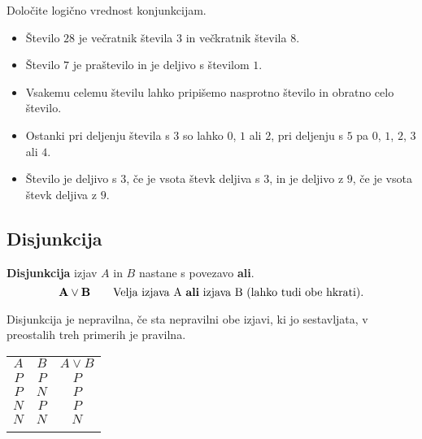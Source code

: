          

         
             \begin{naloga}
                Določite logično vrednost konjunkcijam.
                \begin{itemize}
                    \item Število $28$ je večratnik števila $3$ in večkratnik števila $8$.
                    \item Število $7$ je praštevilo in je deljivo s številom $1$.
                    \item Vsakemu celemu številu lahko pripišemo nasprotno število in obratno celo število.
                    \item Ostanki pri deljenju števila s $3$ so lahko $0$, $1$ ali $2$, 
                        pri deljenju s $5$ pa $0$, $1$, $2$, $3$ ali $4$.
                    \item Število je deljivo s $3$, če je vsota števk deljiva s $3$, in je 
                        deljivo z $9$, če je vsota števk deljiva z $9$.
                \end{itemize}
            \end{naloga}
         

         
             \subsection{Disjunkcija}
                \textbf{Disjunkcija} izjav $A$ in $B$ nastane s povezavo \textbf{ali}.
                $$ \mathbf{A\lor B} \quad \quad \textmd{Velja izjava A \textbf{ali} izjava B 
                (lahko tudi obe hkrati).}$$
             
                      
                        Disjunkcija je nepravilna, če sta nepravilni obe izjavi, ki jo sestavljata,
                        v preostalih treh primerih je pravilna.
                     

                    \begin{table}[H]
                        \centering
                        \begin{tabular}{||c|c|c||} 
                        \hhline{|t:===:t|}
                        \rowcolor[rgb]{0.843,0.718,0.718} $A$ & $B$ & $A\lor B$  \\ 
                        \hhline{|:===:|}
                        $P$ & $P$ & $P$                         \\ 
                        \hline
                        $P$ & $N$ & $P$                         \\ 
                        \hline
                        $N$ & $P$ & $P$                         \\ 
                        \hline
                        $N$ & $N$ & $N$                         \\
                        \hhline{|b:===:b|}
                        \end{tabular}
                    \end{table}



